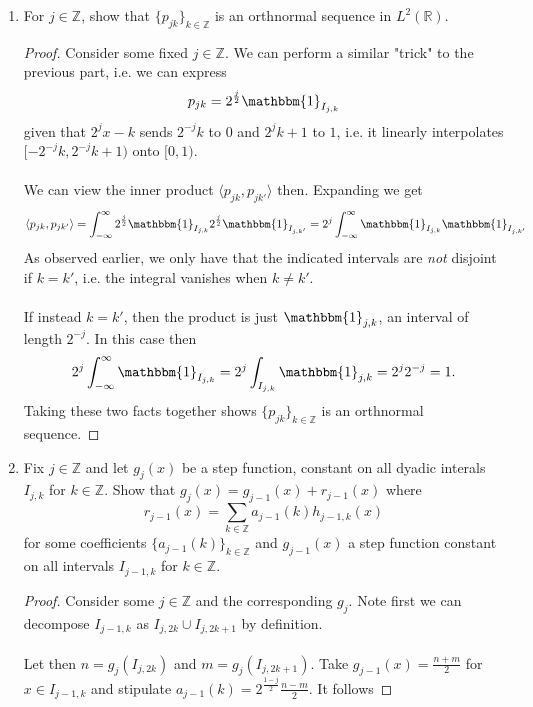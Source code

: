 \documentclass[12pt]{article}
\newenvironment{ex}[2][Exercise]{\begin{trivlist}
\item[\hskip \labelsep {\bfseries #1}\hskip \labelsep {\bfseries #2.}]}{\end{trivlist}}
\begin{document}
\begin{ex}{14}
\begin{enumerate}
\begin{proof}
        \end{proof}
        \item For $j \in \mathbb{Z}$, show that $\{p_{jk}\}_{k \in \mathbb{Z}}$ is an orthnormal sequence in $L^2(\mathbb{R})$. 
        \begin{proof}
            Consider some fixed $j \in \mathbb{Z}$. We can perform a similar "trick" to the previous part, i.e. we can express 
            $$p_{jk} = 2^{\frac{j}{2}}\mathbbm{1}_{I_{j,k}}$$
            given that $2^jx - k$ sends $2^{-j}k$ to $0$ and $2^{j}k + 1$ to $1$, i.e. it linearly interpolates $[-2^{-j}k, 2^{-j}k + 1)$ onto $[0,1)$. \\ \\
            We can view the inner product $\langle p_{jk}, p_{jk'} \rangle$ then. Expanding we get 
            $$\langle p_{jk}, p_{jk'} \rangle = \int_{-\infty}^\infty 2^{\frac{j}{2}}\mathbbm{1}_{I_{j,k}}2^{\frac{j}{2}}\mathbbm{1}_{I_{j,k'}} = 2^j\int_{-\infty}^\infty \mathbbm{1}_{I_{j,k}}\mathbbm{1}_{I_{j,k'}}$$
            As observed earlier, we only have that the indicated intervals are \textit{not} disjoint if $k = k'$, i.e. the integral vanishes when $k \neq k'$.  \\ \\
            If instead $k = k'$, then the product is just $\mathbbm{1}_{j,k}$, an interval of length $2^{-j}$. In this case then 
            $$2^j\int_{-\infty}^\infty \mathbbm{1}_{I_{j,k}} = 2^j\int_{I_{j,k}} \mathbbm{1}_{j,k} = 2^j2^{-j} = 1.$$
            Taking these two facts together shows $\{p_{jk}\}_{k \in \mathbb{Z}}$ is an orthnormal sequence.
        \end{proof}
        \item Fix $j \in \mathbb{Z}$ and let $g_j(x)$ be a step function, constant on all dyadic interals $I_{j,k}$ for $k \in \mathbb{Z}$. Show that $g_j(x) = g_{j - 1}(x) + r_{j - 1}(x)$ where 
        $$r_{j - 1}(x) = \sum_{k \in \mathbb{Z}} a_{j - 1}(k)h_{j - 1, k}(x)$$
        for some coefficients $\{a_{j - 1}(k)\}_{k \in \mathbb{Z}}$ and $g_{j - 1}(x)$ a step function constant on all intervals $I_{j - 1, k}$ for $k \in \mathbb{Z}$.
        \begin{proof}
            Consider some $j \in \mathbb{Z}$ and the corresponding $g_j$. Note first we can decompose $I_{j - 1, k}$ as $I_{j, 2k} \cup I_{j, 2k + 1}$ by definition. \\ \\
            Let then $n = g_j(I_{j, 2k})$ and $m = g_j(I_{j, 2k + 1})$. Take $g_{j - 1}(x) = \frac{n + m}{2}$ for $x \in I_{j - 1,k}$ and stipulate $a_{j - 1}(k) = 2^{\frac{1 - j}{2}}\frac{n - m}{2}$. It follows

\end{proof}
\end{enumerate}
\end{ex}
\end{document}
